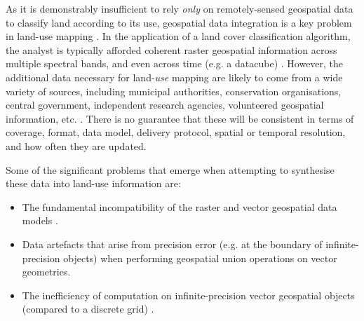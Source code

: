 \documentclass[]{interact}
\theoremstyle{plain}%
\theoremstyle{definition}
\theoremstyle{remark}
\begin{document}
As it is demonstrably insufficient to rely \textit{only} on remotely-sensed geospatial data to classify land according to its use, geospatial data integration is a key problem in land-use mapping \citep{lillesand2015remote}. In the application of a land cover classification algorithm, the analyst is typically afforded coherent raster geospatial information across multiple spectral bands, and even across time (e.g. a datacube) \citep{kopp2019achieving}. However, the additional data necessary for land-\textit{use} mapping are likely to come from a wide variety of sources, including municipal authorities, conservation organisations, central government, independent research agencies, volunteered geospatial information, etc. \citep{rozenstein2011comparison}. There is no guarantee that these will be consistent in terms of coverage, format, data model, delivery protocol, spatial or temporal resolution, and how often they are updated.

Some of the significant problems that emerge when attempting to synthesise these data into land-use information are:

\begin{itemize}
    \item The fundamental incompatibility of the raster and vector geospatial data models \citep{piwowar1990integration,goodchild1994integrating}.
    \item Data artefacts that arise from precision error (e.g. at the boundary of infinite-precision objects) when performing geospatial union operations on vector geometries. \citep{schneider2003design,veregin1989error}
    \item The inefficiency of computation on infinite-precision vector geospatial objects (compared to a discrete grid) \citep{hojati2022giscience}.
\end{itemize}
\end{document}

